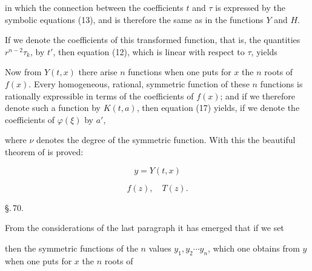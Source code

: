 

in which the connection between the coefficients $t$ and $\tau$
is expressed by the symbolic equations (13), and is therefore the
same as in the functions $Y$ and $H$.


If we denote the coefficients of this transformed function,
that is, the quantities $r^{n-2}\tau_k$, by $t'$, then equation (12),
which is linear with respect to $\tau$, yields


Now from $Y(t, x)$ there arise $n$ functions when one puts
for $x$ the $n$ roots of $f(x)$. Every homogeneous, rational,
symmetric function of these $n$ functions is rationally expressible
in terms of the coefficients of $f(x)$; and if we therefore denote such
a function by $K(t, a)$, then equation (17) yields, if we denote
the coefficients of $\varphi(\xi)$ by $a'$,


where $\nu$ denotes the degree of the symmetric function. With
this the beautiful theorem of  is proved:


\[
y = Y(t, x)
\]


\[
f(z), \quad T(z).
\]

\begin{center}
\S.\,70.\\[2pt]
\end{center}

From the considerations of the last paragraph it has
emerged that if we set


then the symmetric functions of the $n$ values $y_1, y_2 \cdots y_n$,
which one obtains from $y$ when one puts for $x$ the $n$ roots of
